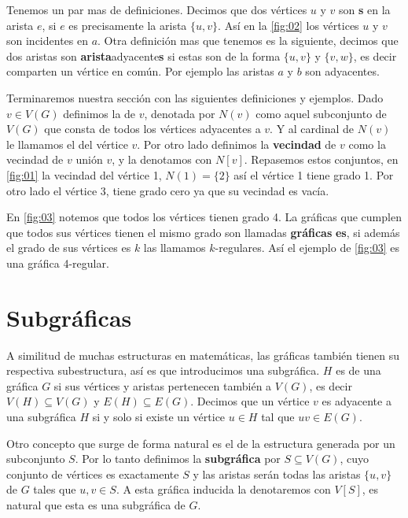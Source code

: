 Tenemos un par mas de definiciones.
Decimos que dos vértices $u$ y $v$ son \textbf{s} en la arista $e$, si $e$ es precisamente la arista $\{ u,v\}$.
Así en la \cref{fig:02} los vértices $u$ y $v$ son incidentes en $a$.
Otra definición mas que tenemos es la siguiente, decimos que dos aristas son \indice\textbf{arista}{adyacente}\textbf{s} si estas son de la forma $\{ u,v\}$ y $\{ v,w\}$, es decir comparten un vértice en común. Por ejemplo las aristas $a$ y $b$ son adyacentes. 

Terminaremos nuestra sección con las siguientes definiciones y ejemplos.
Dado $v\in V(G)$ definimos la  de $v$, denotada por $N(v)$ como aquel subconjunto de $V(G)$ que consta de todos los vértices adyacentes a $v$. Y al cardinal de $N(v)$ le llamamos el  del vértice $v$. Por otro lado definimos la \textbf{vecindad}  de $v$ como la vecindad de $v$ unión $v$, y la denotamos con $N[v]$.
Repasemos estos conjuntos, en \cref{fig:01} la vecindad del vértice 1, $N(1)= \{ 2 \}$  así el vértice 1 tiene grado 1. Por otro lado el vértice 3, tiene grado cero ya que su vecindad es vacía.

En \cref{fig:03} notemos que todos los vértices tienen grado 4. La gráficas que cumplen que todos sus vértices tienen el mismo grado son llamadas \textbf{gráficas} \textbf{es}, si además el grado de sus vértices es $k$ las llamamos $k$-regulares. Así el ejemplo de \cref{fig:03} es una gráfica 4-regular.

\section{Subgráficas}
\label{sec:SbGrfcs}

A similitud de muchas estructuras en matemáticas, las gráficas también tienen su respectiva subestructura, así es que introducimos una subgr\'afica. 
$H$ es  de una gráfica $G$ si sus vértices y aristas pertenecen también a $V(G)$, es decir $V(H)\subseteq V(G)$ y $E(H) \subseteq E(G) $. Decimos que un vértice $v$ es adyacente a una subgráfica $H$ si y solo si existe un vértice $u\in H$ tal que $uv\in E(G)$.

Otro concepto que surge de forma natural es el de la estructura generada por un subconjunto $S$. Por lo tanto definimos la \textbf{subgráfica}  por $S\subseteq V(G)$, cuyo conjunto de vértices es exactamente $S$ y las aristas serán todas las aristas $\{u,v\} $ de $G$ tales que $u,v \in S$. A esta gráfica inducida la denotaremos con $V[S]$, es natural que esta es una subgráfica de $G$.

